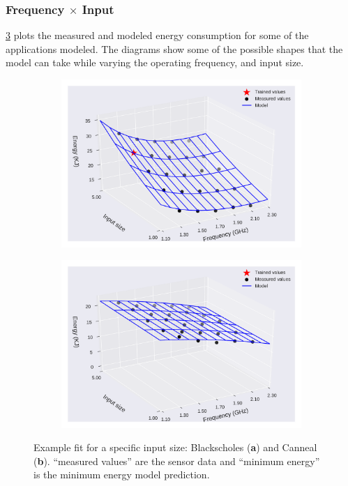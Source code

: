 \subsubsection{Frequency $\times$ Input}
\cref{fig:en_eq_freq_inp_fi} plots the measured and modeled energy consumption for some of the applications modeled. The diagrams show some of the possible shapes that the model can take while varying the operating frequency, and input size.
\begin{figure}[H]
	\centering
	\captionsetup[subfigure]{justification=centering}
	\begin{subfigure}[b]{0.45\textwidth}
		\centerline{\includegraphics[width=\columnwidth]{models/figures/energy/freq_inps/completo_black_5.pdf}}
		\caption{}
		\label{fig:en_eq_black_fi}
	\end{subfigure}
	\begin{subfigure}[b]{0.45\textwidth}
		\centerline{\includegraphics[width=\columnwidth]{models/figures/energy/freq_inps/completo_canneal_1.pdf}}
		\caption{}
		\label{fig:en_eq_canneal_fi}
	\end{subfigure}
	
	\caption{Example fit for a specific input size: Blackscholes (\textbf{a}) and Canneal (\textbf{b}).  “measured values” are the sensor data and “minimum energy” is the minimum energy model prediction.
	}
	\label{fig:en_eq_freq_inp_fi}
\end{figure}
